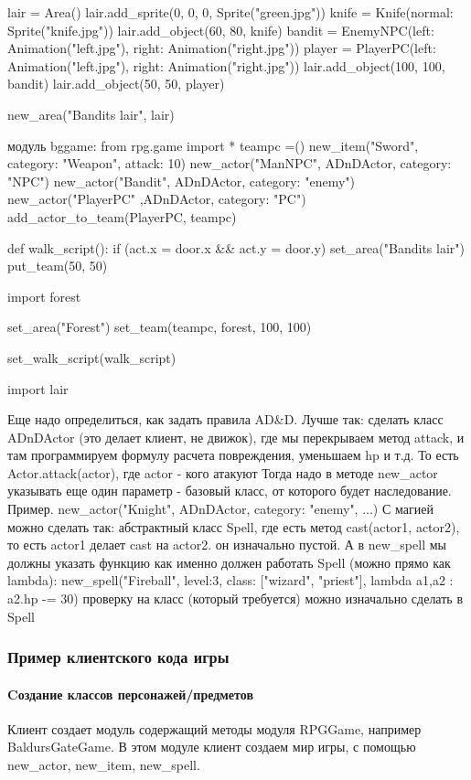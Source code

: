 lair = Area()
lair.add\_sprite(0, 0, 0, Sprite("green.jpg"))
knife = Knife(normal: Sprite("knife.jpg"))
lair.add\_object(60, 80, knife)
bandit = EnemyNPC(left: Animation("left.jpg"), right: Animation("right.jpg"))
player = PlayerPC(left: Animation("left.jpg"), right: Animation("right.jpg"))
lair.add\_object(100, 100, bandit)
lair.add\_object(50, 50, player)

new\_area("Bandits lair", lair)

модуль bggame:
from rpg.game import *
teampc =()
new\_item("Sword", category: "Weapon", attack: 10)
new\_actor("ManNPC",  ADnDActor, category: "NPC")
new\_actor("Bandit",  ADnDActor, category: "enemy")
new\_actor("PlayerPC" ,ADnDActor, category: "PC")
add\_actor\_to\_team(PlayerPC, teampc)

def walk\_script():
	if (act.x = door.x \&\& act.y = door.y)
		set\_area("Bandits lair")
		put\_team(50, 50)

import forest

set\_area("Forest")
set\_team(teampc, forest, 100, 100)


set\_walk\_script(walk\_script)

import lair


Еще надо определиться, как задать правила AD\&D.
Лучше так: сделать класс ADnDActor (это делает клиент, не движок), где мы перекрываем метод attack, и там программируем формулу расчета повреждения, уменьшаем hp и т.д.
То есть Actor.attack(actor), где actor - кого атакуют
Тогда надо в методе new\_actor указывать еще один параметр - базовый класс, от которого будет наследование.
Пример.
new\_actor("Knight", ADnDActor, category: "enemy", ...)
С магией можно сделать так:
абстрактный класс Spell, где есть метод cast(actor1, actor2), то есть actor1 делает cast на actor2. он изначально пустой. А в new\_spell мы должны указать функцию как именно должен работать Spell (можно прямо как lambda):
new\_spell("Fireball", level:3, class: ["wizard", "priest"], lambda a1,a2 : a2.hp -= 30)
проверку на класс (который требуется) можно изначально сделать в Spell


\subsubsection{Пример клиентского кода игры}
\paragraph{Cоздание классов персонажей/предметов}
Клиент создает модуль содержащий методы модуля RPGGame, например BaldursGateGame. В этом модуле клиент создаем мир игры, с помощью new\_actor, new\_item, new\_spell. 


